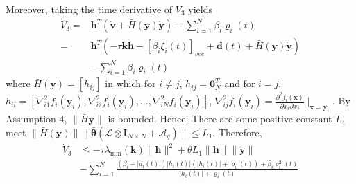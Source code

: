 \documentclass[lettersize,journal]{IEEEtran}
\begin{document}
\begin{IEEEproof}
    Moreover, taking the time derivative of $V_3$ yields
    \begin{equation}
        \begin{aligned}
            \dot{V}_3  = & {\mathbf{h}}^T(\dot{\mathbf{v}}+\bar{H}(\mathbf{y})\dot{\mathbf{y}}) - \sum_{i = 1}^{N} \beta_i\varrho_i(t)          \\
            =            & {\mathbf{h}}^T(-\tau\mathbf{k}\mathbf{h}-[\beta_i\xi_i(t)]_{vec}+\mathbf{d}(t) +\bar{H}(\mathbf{y})\dot{\mathbf{y}}) \\
                         & - \sum_{i = 1}^{N} \beta_i\varrho_i(t)
        \end{aligned}
    \end{equation}
    where $\bar{H}(\mathbf{y})=[h_{ij}]$ in which for $i \neq j$, $h_{ij} = \mathbf{0}_N^T$ and for $i = j$, $h_{ii}=[\nabla_{i1}^{2}f_{i}(\mathbf{y}_{i}),\nabla_{i2}^{2}f_{i}(\mathbf{y}_{i}),\ldots,\nabla_{iN}^{2}f_{i}(\mathbf{y}_{i})]$, $\nabla_{ij}^{2}f_{i}(\mathbf{y}_{i})=\frac{\partial^{2}f_{i}(\mathbf{x})}{\partial x_{i}\partial x_{j}}\mid_{\mathbf{x}=\mathbf{y}_{i}}$. By Assumption 4, $\|\bar{H}\mathbf{y}\|$ is bounded. Hence, There are some positive constant $L_1$ meet $\|\bar{H}(\mathbf{y})\|\|\bar{\boldsymbol{\theta}}(\mathcal{L}\otimes \mathbf{I}_{N\times N}+\mathcal{A}_{q})\|\leq L_{1}$. Therefore,
    \begin{equation}
        \begin{aligned}
            \dot{V}_3 & \leq-\tau\lambda_{\min}(\mathbf{k})\|{\mathbf{h}}\|^2+\theta L_1\|{\mathbf{h}}\|\|\tilde{\mathbf{y}}\|                       \\
                      & -\sum_{i = 1}^{N}\frac{(\beta_i - |d_i(t)|)|h_i(t)|(|h_i(t)|+\varrho_i(t)) + \beta_i\varrho_i^2(t)}{|h_i(t)| + \varrho_i(t)}
        \end{aligned}
    \end{equation}


\end{IEEEproof}
\end{document}
